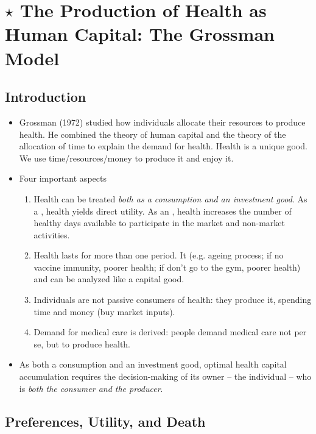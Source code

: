 \section{$\star$ The Production of Health as Human Capital: The Grossman Model}

    \subsection{Introduction}
    
        \begin{itemize}
            \item Grossman (1972) studied how individuals allocate their resources to produce health. He combined the theory of human capital and the theory of the allocation of time to explain the demand for health. Health is a unique good. We use time/resources/money to produce it and enjoy it.
            \item Four important aspects
            \begin{enumerate}
                    \item Health can be treated \emph{both as a consumption and an investment good}. As a , health yields direct utility. As an , health increases the number of healthy days available to participate in the market and non-market activities.
                    \item Health lasts for more than one period. It  (e.g. ageing process; if no vaccine immunity, poorer health; if don't go to the gym, poorer health) and can be analyzed like a capital good.
                    \item Individuals are not passive consumers of health: they produce it, spending time and money (buy market inputs).
                    \item Demand for medical care is derived: people demand medical care not per se, but to produce health.
                \end{enumerate}
            \item As both a consumption and an investment good, optimal health capital accumulation requires the decision-making of its owner – the individual – who is \emph{both the consumer and the producer}.    
        \end{itemize}        

    \subsection{Preferences, Utility, and Death}
    
